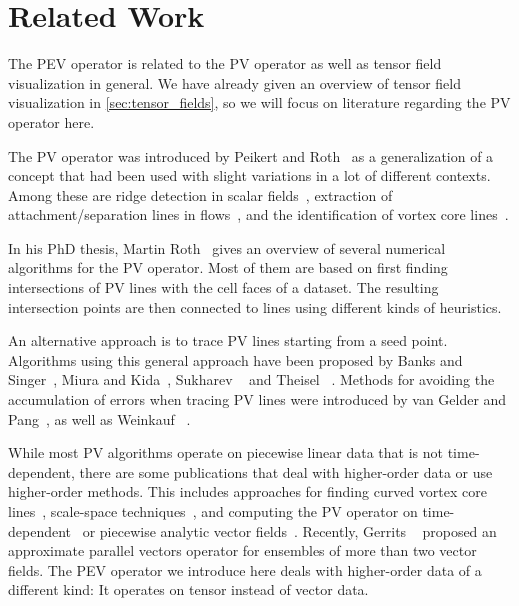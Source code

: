 \section{Related Work} %
\label{sec:pev_related_work}
%
The \ac{PEV} operator is related to the \ac{PV} operator as well as tensor field
visualization in general.
%
We have already given an overview of tensor field visualization in
\cref{sec:tensor_fields}, so we will focus on literature regarding the \ac{PV}
operator here.
%

%
The \ac{PV} operator was introduced by Peikert and Roth~\cite{Peikert1999} as a
generalization of a concept that had been used with slight variations in a lot
of different contexts.
%
Among these are ridge detection in scalar fields~\cite{Haralick1983},
extraction of attachment/separation lines in flows~\cite{Kenwright1999},
and the identification of vortex core lines~\cite{Sujudi1995,Banks1995}.
%

%
In his PhD thesis, Martin Roth~\cite{Roth2000} gives an overview of several
numerical algorithms for the \ac{PV} operator.
%
Most of them are based on first finding intersections of \ac{PV} lines with the
cell faces of a dataset.
%
The resulting intersection points are then connected to lines using different
kinds of heuristics.
%

%
An alternative approach is to trace \ac{PV} lines starting from a seed point.
%
Algorithms using this general approach have been proposed by Banks and
Singer~\cite{Banks1995}, Miura and Kida~\cite{Miura1997}, Sukharev
\etal~\cite{Sukharev2006} and Theisel \etal~\cite{Theisel2003a}.
%
Methods for avoiding the accumulation of errors when tracing \ac{PV} lines were
introduced by van Gelder and Pang~\cite{Gelder2009}, as well as Weinkauf
\etal~\cite{Weinkauf2011}.
%

%
While most \ac{PV} algorithms operate on piecewise linear data that is not
time-dependent, there are some publications that deal with higher-order data
or use higher-order methods.
%
This includes approaches for finding curved vortex core lines~\cite{Roth1998},
scale-space techniques~\cite{Bauer2002}, and computing the \ac{PV} operator on
time-dependent~\cite{Theisel2005,Fuchs2007} or piecewise analytic vector
fields~\cite{Pagot2011}.
%
Recently, Gerrits \etal{}~\cite{Gerrits2018} proposed an approximate parallel
vectors operator for ensembles of more than two vector fields.
%
The \ac{PEV} operator we introduce here deals with higher-order data of a
different kind: It operates on tensor instead of vector data.
%
